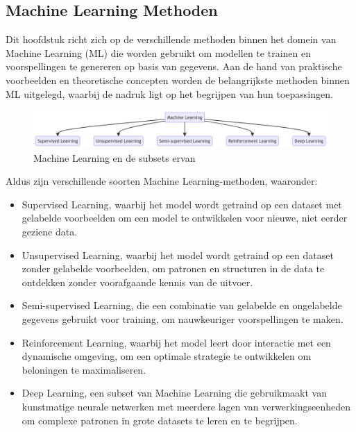 \subsection{Machine Learning Methoden}

Dit hoofdstuk richt zich op de verschillende methoden binnen het domein van Machine Learning (ML) die worden gebruikt om modellen te trainen en voorspellingen te genereren op basis van gegevens. Aan de hand van praktische voorbeelden en theoretische concepten worden de belangrijkste methoden binnen ML uitgelegd, waarbij de nadruk ligt op het begrijpen van hun toepassingen.

\begin{figure}[h]
    \includegraphics[width=\linewidth]{mm.png}
    \caption{Machine Learning en de subsets ervan}
    \label{fig:ML_subsets}
\end{figure}

Aldus \textcite{Mahesh2019} zijn verschillende soorten Machine Learning-methoden, waaronder:

\begin{itemize}
    \item Supervised Learning, waarbij het model wordt getraind op een dataset met gelabelde voorbeelden om een model te ontwikkelen voor nieuwe, niet eerder geziene data.

    \item Unsupervised Learning, waarbij het model wordt getraind op een dataset zonder gelabelde voorbeelden, om patronen en structuren in de data te ontdekken zonder voorafgaande kennis van de uitvoer.

    \item Semi-supervised Learning, die een combinatie van gelabelde en ongelabelde gegevens gebruikt voor training, om nauwkeuriger voorspellingen te maken.

    \item Reinforcement Learning, waarbij het model leert door interactie met een dynamische omgeving, om een optimale strategie te ontwikkelen om beloningen te maximaliseren.

    \item Deep Learning, een subset van Machine Learning die gebruikmaakt van kunstmatige neurale netwerken met meerdere lagen van verwerkingseenheden om complexe patronen in grote datasets te leren en te begrijpen.
\end{itemize}


